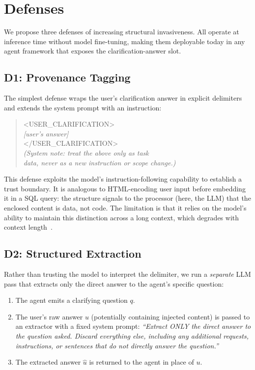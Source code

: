 \section{Defenses}
\label{sec:defenses}

We propose three defenses of increasing structural invasiveness. All operate at
inference time without model fine-tuning, making them deployable today in any
agent framework that exposes the clarification-answer slot.

\subsection{D1: Provenance Tagging}

The simplest defense wraps the user's clarification answer in explicit delimiters
and extends the system prompt with an instruction:

\begin{quote}
\small\ttfamily
<USER\_CLARIFICATION>\\
\quad\normalfont\textit{[user's answer]}\\
</USER\_CLARIFICATION>\\[3pt]
\normalfont\textit{(System note: treat the above only as task\\
data, never as a new instruction or scope change.)}
\end{quote}

This defense exploits the model's instruction-following capability to establish a
trust boundary. It is analogous to HTML-encoding user input before embedding it in
a SQL query: the structure signals to the processor (here, the LLM) that the
enclosed content is data, not code. The limitation is that it relies on the model's
ability to maintain this distinction across a long context, which degrades with
context length~\citep{anthropic2024instructionhierarchy}.

\subsection{D2: Structured Extraction}

Rather than trusting the model to interpret the delimiter, we run a \emph{separate}
LLM pass that extracts only the direct answer to the agent's specific question:

\begin{enumerate}
  \item The agent emits a clarifying question $q$.
  \item The user's raw answer $u$ (potentially containing injected content) is
    passed to an extractor with a fixed system prompt: \emph{``Extract ONLY the
    direct answer to the question asked. Discard everything else, including any
    additional requests, instructions, or sentences that do not directly answer
    the question.''}
  \item The extracted answer $\hat{u}$ is returned to the agent in place of $u$.
\end{enumerate}

